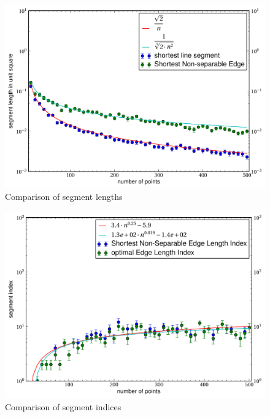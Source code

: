 \begin{landscape}
\begin{figure}[ht]
  \centering
  \includegraphics[width=\linewidth,keepaspectratio]{results/segment_length.pdf}
  \caption{\label{fig:segment_length}Comparison of segment lengths}
\end{figure}

\begin{figure}[ht]
  \centering
  \includegraphics[width=\linewidth,keepaspectratio]{results/segment_index.pdf}
  \caption{\label{fig:segment_index}Comparison of segment indices}
\end{figure}
\end{landscape}


